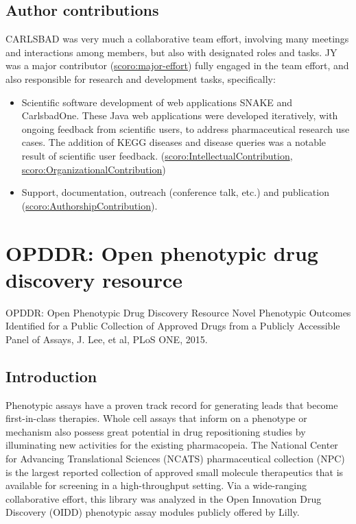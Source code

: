 \subsection{Author contributions}

CARLSBAD was very much a collaborative team effort, involving many meetings and interactions among members, but also with designated roles and tasks. JY was a major contributor (\href{http://purl.org/spar/scoro/major-effort}{scoro:major-effort}) fully engaged in the team effort, and also responsible for research and development tasks, specifically:

\begin{itemize}
    \item Scientific software development of web applications SNAKE and CarlsbadOne. These Java web applications were developed iteratively, with ongoing feedback from scientific users, to address pharmaceutical research use cases. The addition of KEGG diseases and disease queries was a notable result of scientific user feedback. (\href{http://purl.org/spar/scoro/IntellectualContribution}{scoro:IntellectualContribution}, \href{http://purl.org/spar/scoro/OrganizationalContribution}{scoro:OrganizationalContribution})
    \item Support, documentation, outreach (conference talk, etc.) and publication (\href{http://purl.org/spar/scoro/AuthorshipContribution}{scoro:AuthorshipContribution}). 
\end{itemize}

\section{OPDDR: Open phenotypic drug discovery resource}

OPDDR: Open Phenotypic Drug Discovery Resource
Novel Phenotypic Outcomes Identified for a Public Collection of Approved Drugs from a Publicly Accessible Panel of Assays, J. Lee, et al, PLoS ONE, 2015\cite{Lee2015-vg}.



\subsection{Introduction}

Phenotypic assays have a proven track record for generating leads that become first-in-class therapies. Whole cell assays that inform on a phenotype or mechanism also possess great potential in drug repositioning studies by illuminating new activities for the existing pharmacopeia. The National Center for Advancing Translational Sciences (NCATS) pharmaceutical collection (NPC) is the largest reported collection of approved small molecule therapeutics that is available for screening in a high-throughput setting. Via a wide-ranging collaborative effort, this library was analyzed in the Open Innovation Drug Discovery (OIDD) phenotypic assay modules publicly offered by Lilly. 

